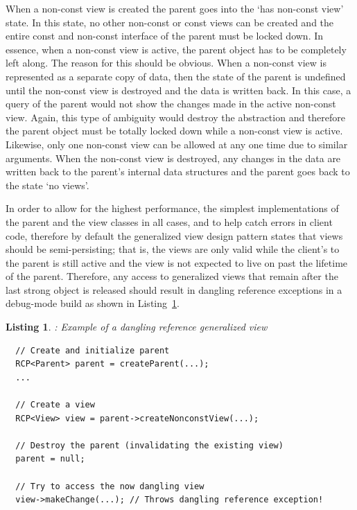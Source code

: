 \documentclass[pdf,ps2pdf,11pt]{SANDreport}
\newtheorem{listing}{Listing}
\begin{document}
When a non-const view is created the parent goes into the `has
non-const view' state.  In this state, no other non-const or const
views can be created and the entire const and non-const interface of
the parent must be locked down.  In essence, when a non-const view is
active, the parent object has to be completely left along.  The reason
for this should be obvious.  When a non-const view is represented as a
separate copy of data, then the state of the parent is undefined until
the non-const view is destroyed and the data is written back.  In this
case, a query of the parent would not show the changes made in the
active non-const view.  Again, this type of ambiguity would destroy
the abstraction and therefore the parent object must be totally locked
down while a non-const view is active.  Likewise, only one non-const
view can be allowed at any one time due to similar arguments.  When
the non-const view is destroyed, any changes in the data are written
back to the parent's internal data structures and the parent goes back
to the state `no views'.

In order to allow for the highest performance, the simplest
implementations of the parent and the view classes in all cases, and
to help catch errors in client code, therefore by default the
generalized view design pattern states that views should be
semi-persisting; that is, the views are only valid while the client's
{} to the parent is still active and the view is not expected
to live on past the lifetime of the parent.  Therefore, any access to
generalized views that remain after the last strong
{} object is released should result in dangling
reference exceptions in a debug-mode build as shown in
Listing~\ref{listing:generalized-view-dangling}.


\begin{listing}:  Example of a dangling reference generalized view  \\
\label{listing:generalized-view-dangling}
{\small\begin{verbatim}
  // Create and initialize parent
  RCP<Parent> parent = createParent(...);
  ...

  // Create a view
  RCP<View> view = parent->createNonconstView(...);

  // Destroy the parent (invalidating the existing view)
  parent = null;

  // Try to access the now dangling view
  view->makeChange(...); // Throws dangling reference exception!
\end{verbatim}}
\end{listing}
\end{document}
